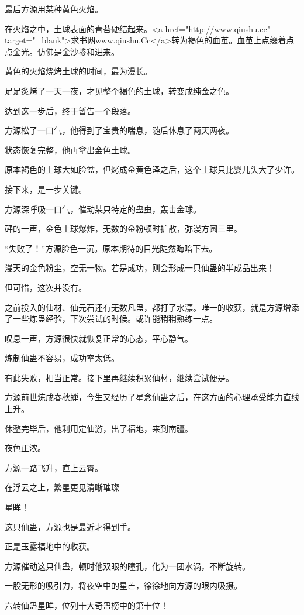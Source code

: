 \begin{this_body}
最后方源用某种黄色火焰。

在火焰之中，土球表面的青苔硬结起来。<a href="http://www.qiushu.cc" target="\_blank">求书网www.qiushu.Cc</a>转为褐色的血茧。血茧上点缀着点点金光。仿佛是金沙掺和进来。

黄色的火焰烧烤土球的时间，最为漫长。

足足炙烤了一天一夜，才见整个褐色的土球，转变成纯金之色。

达到这一步后，终于暂告一个段落。

方源松了一口气，他得到了宝贵的喘息，随后休息了两天两夜。

状态恢复完整，他再拿出金色土球。

原本褐色的土球大如脸盆，但烤成金黄色泽之后，这个土球只比婴儿头大了少许。

接下来，是一步关键。

方源深呼吸一口气，催动某只特定的蛊虫，轰击金球。

砰的一声，金色土球爆炸，无数的金粉顿时扩散，弥漫方圆三里。

“失败了！”方源脸色一沉。原本期待的目光陡然晦暗下去。

漫天的金色粉尘，空无一物。若是成功，则会形成一只仙蛊的半成品出来！

但可惜，这次并没有。

之前投入的仙材、仙元石还有无数凡蛊，都打了水漂。唯一的收获，就是方源增添了一些炼蛊经验，下次尝试的时候。或许能稍稍熟练一点。

叹息一声，方源很快就恢复正常的心态，平心静气。

炼制仙蛊不容易，成功率太低。

有此失败，相当正常。接下里再继续积累仙材，继续尝试便是。

方源前世炼成春秋蝉，今生又经历了星念仙蛊之后，在这方面的心理承受能力直线上升。

休整完毕后，他利用定仙游，出了福地，来到南疆。

夜色正浓。

方源一路飞升，直上云霄。

在浮云之上，繁星更见清晰璀璨

星眸！

这只仙蛊，方源也是最近才得到手。

正是玉露福地中的收获。

方源催动这只仙蛊，顿时他双眼的瞳孔，化为一团水涡，不断旋转。

一股无形的吸引力，将夜空中的星芒，徐徐地向方源的眼内吸摄。

六转仙蛊星眸，位列十大奇蛊榜中的第十位！


\end{this_body}
